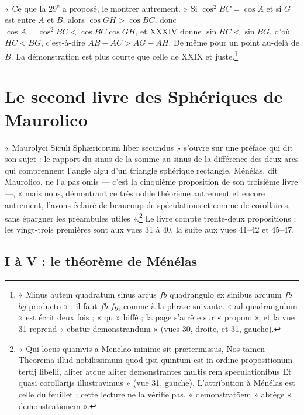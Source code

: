 \documentclass[11pt,a4paper]{article}
\begin{document}
« Ce que la 29\textsuperscript{e} a proposé, le montrer autrement. » Si
$\cos^2 BC = \cos A$ et si $G$ est entre $A$ et $B$, alors $\cos GH > \cos BC$,
donc $\cos A = \cos^2 BC < \cos BC\cos GH$, et XXXIV donne $\sin HC < \sin BG$,
d'où $HC < BG$, c'est-à-dire $AB - AC > AG - AH$. De même pour un point au-delà
de $B$. La démonstration est plus courte que celle de XXIX et
juste.\footnote{« Minus autem quadratum sinus arcus $fb$ quadrangulo ex sinibus
arcuum $fb$ $bg$ producto » : il faut $fb$ $fg$, comme à la phrase suivante. « ad
quadrangulum » est écrit deux fois ; « qu » biffé ; la page s'arrête sur
« propon: », et la vue 31 reprend « ebatur demonstrandum » (vues 30, droite, et
31, gauche).}

\section*{Le second livre des Sphériques de Maurolico}

« Maurolyci Siculi Sphæricorum liber secundus » s'ouvre sur une préface qui dit
son sujet : le rapport du sinus de la somme au sinus de la différence des deux
arcs qui comprennent l'angle aigu d'un triangle sphérique rectangle. Ménélas,
dit Maurolico, ne l'a pas omis — c'est la cinquième proposition de son troisième
livre —, « mais nous, démontrant ce très noble théorème autrement et encore
autrement, l'avons éclairé de beaucoup de spéculations et comme de corollaires,
sans épargner les préambules utiles ».\footnote{« Qui locus quamvis a Menelao
minime sit prætermissus, Nos tamen Theorema illud nobilissimum quod ipsi quintum
est in ordine propositionum tertij libelli, aliter atque aliter demonstrantes
multis rem speculationibus Et quasi corollarijs illustravimus » (vue 31,
gauche). L'attribution à Ménélas est celle du feuillet ; cette lecture ne la
vérifie pas. « demonstratõem » abrège « demonstrationem ».} Le livre compte
trente-deux propositions ; les vingt-trois premières sont aux vues 31 à 40, la
suite aux vues 41--42 et 45--47.

\subsection*{I à V : le théorème de Ménélas}
\end{document}
